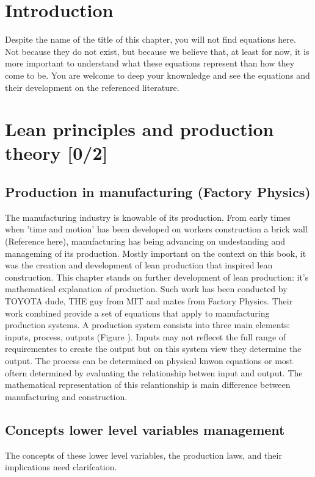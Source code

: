 \documentclass{article}
\begin{document}
\section{Introduction}
\label{sec:org0fb8799}
Despite the name of the title of this chapter, you will not find equations here.
Not because they do not exist, but because we believe that, at least for now, it is more important to understand what these equations represent than how they come to be.
You are welcome to deep your knownledge and see the equations and their development on the referenced literature.
\section{Lean principles and production theory [0/2]}
\label{sec:org468f022}
\subsection{Production in manufacturing (Factory Physics)}
\label{sec:org41773f3}
The manufacturing industry is knowable of its production.
From early times when 'time and motion' has been developed on workers construction a brick wall (Reference here), manufacturing has being advancing on undestanding and manageming of its production.
Mostly important on the context on this book, it was the creation and development of lean production that inspired lean construction.
This chapter stands on further development of lean production: it's mathematical explanation of production.
Such work has been conducted by TOYOTA dude, THE guy from MIT and mates from Factory Physics.
Their work combined provide a set of equations that apply to manufacturing production systems.
A production system consists into three main elements: inputs, process, outputs (Figure ).
Inputs may not reflecet the full range of requirementes to create the output but on this system view they determine the output.
The process can be determined on physical knwon equations or most oftern determined by evaluating the relationship betwen input and output.
The mathematical representation of this relantionship is main difference between manufacturing and construction.

\subsection{Concepts lower level variables management}
\label{sec:org6cc1835}
The concepts of these lower level variables, the production laws, and their implications need clarifcation.
\end{document}

